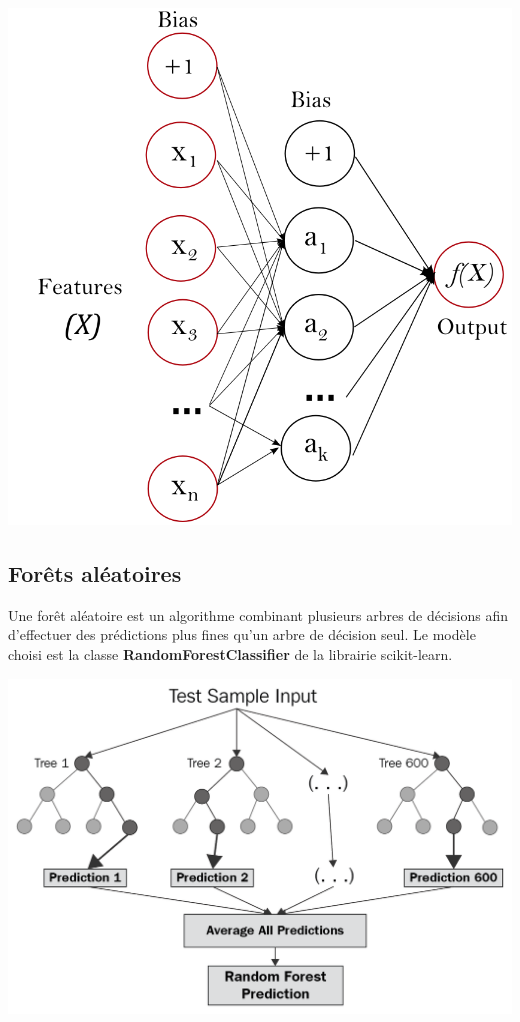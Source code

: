 \begin{center}
\includegraphics[scale=0.5]{figures/exemple_MLP.png}
\label{fig7}
\end{center}

\subsection{Forêts aléatoires}

Une forêt aléatoire est un algorithme combinant plusieurs arbres de décisions afin d’effectuer des prédictions plus fines qu’un arbre de décision seul. Le modèle choisi est la classe \textbf{RandomForestClassifier} de la librairie scikit-learn.

\begin{center}
\includegraphics[scale=0.25]{figures/exemple_RF.png}
\label{fig8}
\end{center}

